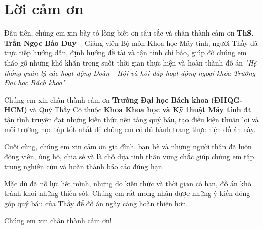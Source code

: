 \section*{Lời cảm ơn}
\thispagestyle{empty}

Đầu tiên, chúng em xin bày tỏ lòng biết ơn sâu sắc và chân thành cảm ơn \textbf{ThS. Trần Ngọc Bảo Duy} -- Giảng viên Bộ môn Khoa học Máy tính, người Thầy đã trực tiếp hướng dẫn, định hướng đề tài và tận tình chỉ bảo, giúp đỡ chúng em tháo gỡ những khó khăn trong suốt thời gian thực hiện và hoàn thành đồ án \textit{"Hệ thống quản lý các hoạt động Đoàn - Hội và hỏi đáp hoạt động ngoại khóa Trường Đại học Bách khoa"}.

Chúng em xin chân thành cảm ơn \textbf{Trường Đại học Bách khoa (ĐHQG-HCM)} và Quý Thầy Cô thuộc \textbf{Khoa Khoa học và Kỹ thuật Máy tính} đã tận tình truyền đạt những kiến thức nền tảng quý báu, tạo điều kiện thuận lợi và môi trường học tập tốt nhất để chúng em có đủ hành trang thực hiện đồ án này.

Cuối cùng, chúng em xin cảm ơn gia đình, bạn bè và những người thân đã luôn động viên, ủng hộ, chia sẻ và là chỗ dựa tinh thần vững chắc giúp chúng em tập trung nghiên cứu và hoàn thành báo cáo đúng hạn.

Mặc dù đã nỗ lực hết mình, nhưng do kiến thức và thời gian có hạn, đồ án khó tránh khỏi những thiếu sót. Chúng em rất mong nhận được những ý kiến đóng góp quý báu của Thầy để đồ án ngày càng hoàn thiện hơn.

Chúng em xin chân thành cảm ơn!

\vspace{2cm}

\clearpage
{}
